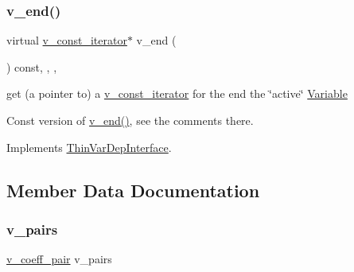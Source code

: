 \subsubsection{\texorpdfstring{v\+\_\+end()}{v\_end()}\hspace{0.1cm}{\footnotesize\ttfamily [2/2]}}
{\footnotesize\ttfamily virtual \mbox{\hyperlink{class_s_m_spp__di__unipi__it_1_1_linear_function_1_1v__const__iterator}{v\+\_\+const\+\_\+iterator}}$\ast$ v\+\_\+end (\begin{DoxyParamCaption}\item[{void}]{ }\end{DoxyParamCaption}) const\hspace{0.3cm}{\ttfamily [inline]}, {\ttfamily [final]}, {\ttfamily [override]}, {\ttfamily [virtual]}}



get (a pointer to) a \mbox{\hyperlink{class_s_m_spp__di__unipi__it_1_1_linear_function_1_1v__const__iterator}{v\+\_\+const\+\_\+iterator}} for the end the \char`\"{}active\char`\"{} \mbox{\hyperlink{class_s_m_spp__di__unipi__it_1_1_variable}{Variable}} 

Const version of \mbox{\hyperlink{class_s_m_spp__di__unipi__it_1_1_linear_function_a84a680d911c65c059b67cfeb63815e29}{v\+\_\+end()}}, see the comments there. 

Implements \mbox{\hyperlink{group___thin_var_dep_interface___c_l_a_s_s_e_s_ga6c504e866663eb64b230179f81370af4}{Thin\+Var\+Dep\+Interface}}.



\subsection{Member Data Documentation}
\mbox{\label{class_s_m_spp__di__unipi__it_1_1_linear_function_a32d816719cd9ec770f15f327e4a2a5dd}} 
\subsubsection{\texorpdfstring{v\+\_\+pairs}{v\_pairs}}
{\footnotesize\ttfamily \mbox{\hyperlink{class_s_m_spp__di__unipi__it_1_1_linear_function_aee8988faa66c7c9013613e2c76580ddf}{v\+\_\+coeff\+\_\+pair}} v\+\_\+pairs\hspace{0.3cm}{\ttfamily [protected]}}




